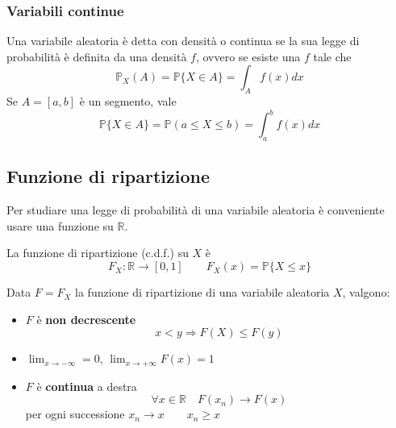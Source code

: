 \subsubsection{Variabili continue}
\begin{definition}
	Una variabile aleatoria è detta con densità o continua se la sua legge di probabilità è definita da una densità $f$, ovvero se esiste una $f$ tale che
	\begin{equation}
		\mathbb{P}_X(A) = \mathbb{P}\{X \in A\}=\int_{A}f(x)dx
	\end{equation}
	Se $A=[a,b]$ è un segmento, vale
	\begin{equation}
		\mathbb{P}\{X \in A\}=\mathbb{P}(a \leq X \leq b) = \int_{a}^{b} f(x) dx
	\end{equation}
\end{definition}
\subsection{Funzione di ripartizione}
Per studiare una legge di probabilità di una variabile aleatoria è conveniente usare una funzione su $\mathbb{R}$.
\begin{definition}
	La funzione di ripartizione (c.d.f.) su $X$ è
	\begin{equation}
		F_X:\mathbb{R}\to[0,1] \quad\quad F_X(x) = \mathbb{P}\{X \leq x\}
	\end{equation}
\end{definition}

\begin{proposition}
	Data $F=F_X$ la funzione di ripartizione di una variabile aleatoria $X$, valgono:
	\begin{itemize}
		\item $F$ è \textbf{non decrescente}
		\begin{equation}
			x < y \Longrightarrow F(X) \leq F(y)
		\end{equation}
		\item $\lim_{x \to -\infty}=0$, $\lim_{x \to + \infty}F(x) = 1$
		\item $F$ è \textbf{continua} a destra
		\begin{equation}
			\forall x \in \mathbb{R} \quad F(x_n) \to F(x)
		\end{equation}
		per ogni successione $x_n \to x \quad\quad x_n \geq x$
	\end{itemize}
\end{proposition}

